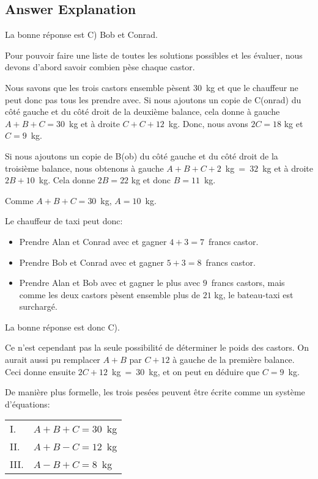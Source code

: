 \documentclass[a4paper,11pt]{report}
\begin{document}
\endgroup

\subsection*{Answer Explanation}

La bonne réponse est C) Bob et Conrad.

Pour pouvoir faire une liste de toutes les solutions possibles et les évaluer, nous devons d’abord savoir combien pèse chaque castor.

Nous savons que les trois castors ensemble pèsent $30$~kg et que le chauffeur ne peut donc pas tous les prendre avec. Si nous ajoutons un copie de C(onrad) du côté gauche et du côté droit de la deuxième balance, cela donne à gauche ${A + B + C = 30}$~kg et à droite ${C + C + 12}$~kg. Donc, nous avons ${2C = 18}$ kg et ${C = 9}$~kg.

Si nous ajoutons un copie de B(ob) du côté gauche et du côté droit de la troisième balance, nous obtenons à gauche ${A + B + C + 2}$~kg~=~$32$~kg et à droite  ${2B + 10}$~kg. Cela donne ${2B = 22}$ kg et donc ${B = 11}$~kg.

Comme ${A + B + C = 30}$~kg, ${A = 10}$~kg.

Le chauffeur de taxi peut donc:

\begin{itemize}
  \item Prendre Alan et Conrad avec et gagner ${4 + 3 = 7}$~francs castor.
  \item Prendre Bob et Conrad avec et gagner ${5 + 3 = 8}$~francs castor.
  \item Prendre Alan et Bob avec et gagner le plus avec $9$~francs castors, mais comme les deux castors pèsent ensemble plus de $21$ kg, le bateau-taxi est surchargé.
\end{itemize}

La bonne réponse est donc C).

Ce n’est cependant pas la seule possibilité de déterminer le poids des castors. On aurait aussi pu remplacer ${A + B}$ par ${C + 12}$ à gauche de la première balance. Ceci donne ensuite ${2C + 12}$~kg~=~$30$~kg, et on peut en déduire que ${C = 9}$~kg.

De manière plus formelle, les trois pesées peuvent être écrite comme un système d’équations:

\begin{tabular}{ @{} l l @{} }
  I. & ${A + B + C = 30}$~kg \\ 
  II. & ${A + B - C = 12}$~kg \\ 
  III. & ${A - B + C = 8}$~kg
\end{tabular}
\end{document}
